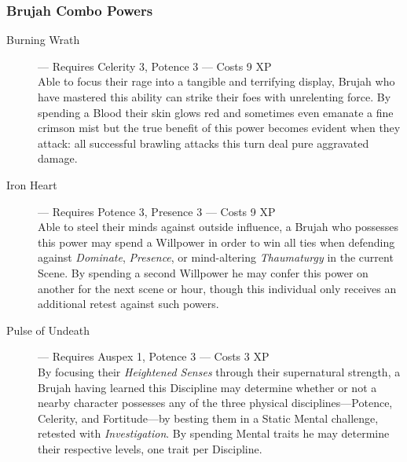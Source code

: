 \subsubsection{Brujah Combo Powers}
\begin{description}
	\item[Burning Wrath]--- Requires Celerity 3, Potence 3 --- Costs 9 XP \\
	Able to focus their rage into a tangible and terrifying display, Brujah who have mastered this 
	ability can strike their foes with unrelenting force.  By spending a Blood their skin glows 
	red and sometimes even emanate a fine crimson mist but the true benefit of this power becomes 
	evident when they attack:  all successful brawling attacks this turn deal pure aggravated damage.
	\item[Iron Heart]--- Requires Potence 3, Presence 3 --- Costs 9 XP \\
	Able to steel their minds against outside influence, a Brujah who possesses this power may spend a 
	Willpower in order to win all ties when defending against \emph{Dominate}, \emph{Presence}, or 
	mind-altering \emph{Thaumaturgy} in the current Scene.  By spending a second Willpower he may 
	confer this power on another for the next scene or hour, though this individual only receives an 
	additional retest against such powers.
	\item[Pulse of Undeath]--- Requires Auspex 1, Potence 3 --- Costs 3 XP \\
	By focusing their \emph{Heightened Senses} through their supernatural strength, a Brujah having 
	learned this Discipline may determine whether or not a nearby character possesses any of the 
	three physical disciplines---Potence, Celerity, and Fortitude---by besting them in a Static 
	Mental challenge, retested with \emph{Investigation}.  By spending Mental traits he may determine 
	their respective levels, one trait per Discipline.
\end{description}


